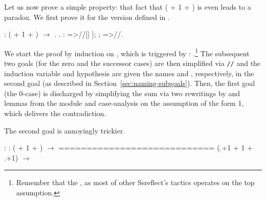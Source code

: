 Let us now prove a simple property: that fact that ( + 1 + ) is
even leads to a paradox. We first prove it for the version defined in
.


\begin{coqdoccode}
\coqdocemptyline
\coqdocnoindent
{}   :  ( + 1 + ) \ensuremath{\rightarrow} .\coqdoceol
\coqdocnoindent
{}.\coqdoceol
\coqdocnoindent
{}: =>//[|  ];     ; =>//.\coqdoceol
\coqdocemptyline
\end{coqdoccode}


We start the proof by induction on , which is triggered by :
.\footnote{Remember that the ,  as most of other
Ssreflect's tactics operates on the top assumption.} The subsequent
two goals (for the zero and the successor cases) are then simplified
via \texttt{//} and the induction variable and hypothesis are given
the names  and , respectively, in the second goal (as described
in Section~\ref{sec:naming-subgoals}). Then, the first goal (the
0-case) is discharged by simplifying the sum via two rewritings by
 and  lemmas from the  module and case-analysis
on the assumption of the form  1, which delivers the
contradiction.


The second goal is annoyingly trickier.


\coqdoceol
\coqdocemptyline
\coqdocindent{1.00em}
 : \coqdoceol
\coqdocindent{1.00em}
 :  ( + 1 + ) \ensuremath{\rightarrow} \coqdoceol
\coqdocindent{1.00em}
============================\coqdoceol
\coqdocindent{1.50em}
 (.+1 + 1 + .+1) \ensuremath{\rightarrow} 

\coqdocemptyline


